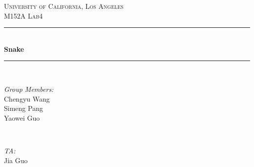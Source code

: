 \documentclass[12pt]{article}
\begin{document}
\begin{titlepage}

\newcommand{\HRule}{\rule{\linewidth}{0.5mm}} %

\center %
 

\textsc{\LARGE University of California, Los Angeles}\\[1.5cm] %
\textsc{\Large M152A Lab4}\\[0.5cm] %
 


\HRule \\[0.4cm]
{ \huge \bfseries Snake}\\[0.4cm] %
\HRule \\[1.5cm]
 

\begin{minipage}{0.4\textwidth}
\begin{flushleft} \large
\emph{Group Members:}\\
Chengyu Wang\\
Simeng Pang\\
Yaowei Guo%
\end{flushleft}
\end{minipage}
~
\begin{minipage}{0.4\textwidth}
\begin{flushright} \large
\emph{TA:} \\
Jia Guo %
\end{flushright}
\end{minipage}\\[4cm]



\end{titlepage}
\end{document}
